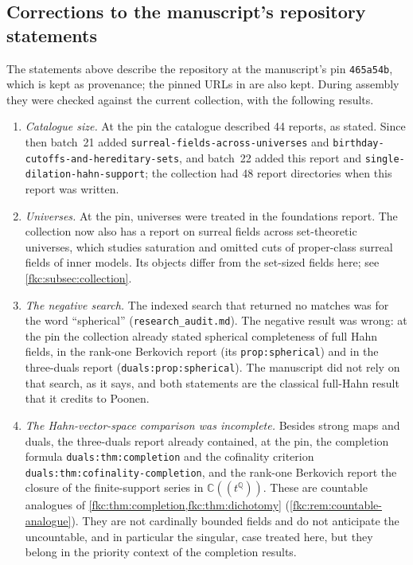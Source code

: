 \documentclass[11pt,letterpaper]{article}
\numberwithin{equation}{section}
\theoremstyle{definition}
\theoremstyle{remark}
\newcommand{\C}{\mathbb C}
\newcommand{\Q}{\mathbb Q}
\begin{document}
\subsection{Corrections to the manuscript's repository statements}
\label{fkc:subsec:corrections}
The statements above describe the repository at the manuscript's pin \texttt{465a54b}, which is kept as provenance; the pinned URLs in \cite{Repo} are also kept. During assembly they were checked against the current collection, with the following results.
\begin{enumerate}[label=\textup{(\arabic*)}]
\item \emph{Catalogue size.} At the pin the catalogue described 44 reports, as stated. Since then batch~21 added \texttt{surreal-fields-across-universes} and \texttt{birthday-cutoffs-and-hereditary-sets}, and batch~22 added this report and \texttt{single-dilation-hahn-support}; the collection had 48 report directories when this report was written.
\item \emph{Universes.} At the pin, universes were treated in the foundations report. The collection now also has a report on surreal fields across set-theoretic universes, which studies saturation and omitted cuts of proper-class surreal fields of inner models. Its objects differ from the set-sized fields here; see \cref{fkc:subsec:collection}.
\item \emph{The negative search.} The indexed search that returned no matches was for the word ``spherical'' (\texttt{research\_audit.md}). The negative result was wrong: at the pin the collection already stated spherical completeness of full Hahn fields, in the rank-one Berkovich report (its \texttt{prop:spherical}) and in the three-duals report (\texttt{duals:prop:spherical}). The manuscript did not rely on that search, as it says, and both statements are the classical full-Hahn result that it credits to Poonen.
\item \emph{The Hahn-vector-space comparison was incomplete.} Besides strong maps and duals, the three-duals report already contained, at the pin, the completion formula \texttt{duals:thm:completion} and the cofinality criterion \texttt{duals:thm:cofinality-completion}, and the rank-one Berkovich report the closure of the finite-support series in $\C((t^\Q))$. These are countable analogues of \cref{fkc:thm:completion,fkc:thm:dichotomy} (\cref{fkc:rem:countable-analogue}). They are not cardinally bounded fields and do not anticipate the uncountable, and in particular the singular, case treated here, but they belong in the priority context of the completion results.

\end{enumerate}
\end{document}
